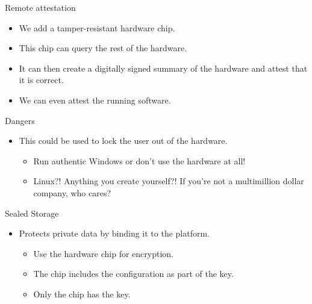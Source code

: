 \documentclass{beamer}
\begin{document}
\begin{frame}
  \begin{block}{Remote attestation}
    \begin{itemize}
      \item We add a tamper-resistant hardware chip.
      \item This chip can query the rest of the hardware.
      \item It can then create a digitally signed summary of the hardware and 
        attest that it is correct.

        \pause{}

      \item We can even attest the running software.
    \end{itemize}
  \end{block}
\end{frame}

\begin{frame}
  \begin{alertblock}{Dangers}
    \begin{itemize}
      \item This could be used to lock the user out of the hardware.
        \begin{itemize}
          \item Run authentic Windows or don't use the hardware at all!
          \item Linux?!
            Anything you create yourself?!
            If you're not a multimillion dollar company, who cares?
        \end{itemize}
    \end{itemize}
  \end{alertblock}
\end{frame}

\begin{frame}
  \begin{block}{Sealed Storage}
    \begin{itemize}
      \item Protects private data by binding it to the platform.
        \begin{itemize}
          \item Use the hardware chip for encryption.
          \item The chip includes the configuration as part of the key.
          \item Only the chip has the key.
        \end{itemize}
    \end{itemize}
  \end{block}
\end{frame}
\end{document}
